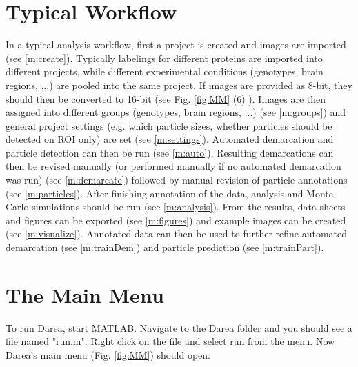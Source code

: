 \documentclass[12pt, a4paper]{scrartcl}
\begin{document}
\section{Typical Workflow}
In a typical analysis workflow, first a project is created and images are imported (see \ref{m:create}). Typically labelings for different proteins are imported into different projects, while different experimental conditions (genotypes, brain regions, ...) are pooled into the same project. If images are provided as 8-bit, they should then be converted to 16-bit (see Fig. \ref{fig:MM} (6) ).
Images are then assigned into different groups (genotypes, brain regions, ...) (see \ref{m:groups}) and general project settings (e.g. which particle sizes, whether particles should be detected on ROI only) are set (see \ref{m:settings}). 
Automated demarcation and particle detection can then be run (see \ref{m:auto}). Resulting demarcations can then be revised manually (or performed manually if no automated demarcation was run) (see \ref{m:demarcate}) followed by manual revision of particle annotations (see \ref{m:particles}). 
After finishing annotation of the data, analysis and Monte-Carlo simulations should be run (see \ref{m:analysis}). From the results, data sheets and figures can be exported (see \ref{m:figures}) and example images can be created (see \ref{m:visualize}).
Annotated data can then be used to further refine automated demarcation (see \ref{m:trainDem}) and particle prediction (see \ref{m:trainPart}).

\section{The Main Menu}
To run Darea, start MATLAB. Navigate to the Darea folder and you should see a file named "run.m". Right click on the file and select run from the menu. Now Darea's main menu (Fig. \ref{fig:MM}) should open.
\end{document}
